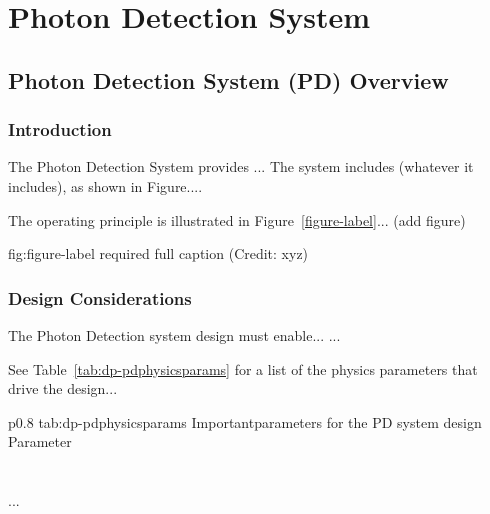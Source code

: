 \chapter{Photon Detection System}
\label{ch:fddp-pd}

\section{Photon Detection System (PD) Overview}
\label{sec:fddp-pd-ov}


\subsection{Introduction}
\label{sec:fddp-pd-intro}

The Photon Detection System provides ...
The system includes (whatever it includes), as shown in Figure.... 


The operating principle is illustrated in Figure~\ref{figure-label}... (add figure)

\begin{dunefigure}{fig:figure-label}
{required full caption (Credit: xyz)}
\end{dunefigure}

\subsection{Design Considerations}
\label{sec:fddp-pd-des-consid}


The Photon Detection system design must enable... 
...


See Table~\ref{tab:dp-pdphysicsparams} for a list of the physics parameters that drive the design...

\begin{dunetable}
{p{0.8\textwidth}}
{tab:dp-pdphysicsparams}
{Importantparameters for the PD system design}   
Parameter  \\ \toprowrule
  \\ \colhline
   \\ \colhline
 ...\\ 
\end{dunetable}

